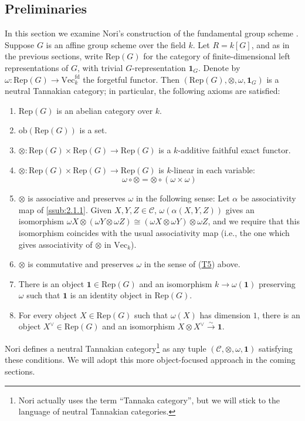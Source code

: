 \documentclass[10pt]{amsart}
\numberwithin{equation}{section}
\def\~#1{\mathscr{#1}}
\newcommand{\isom}{\xrightarrow{\sim}}
\newcommand{\fd}{\mathrm{fd}}
\newcommand{\ob}{\mathrm{ob}}
\renewcommand{\Vec}{\mathrm{Vec}}
\newcommand{\Rep}{\mathrm{Rep}}
\theoremstyle{plain}
\theoremstyle{definition}
\theoremstyle{remark}
\begin{document}
\subsection{Preliminaries}
In this section we examine Nori's construction of the fundamental group scheme \cite{nori76}. Suppose $G$ is an affine group scheme over the field $k$. Let $R = k[G]$, and as in the previous sections, write $\Rep(G)$ for the category of finite-dimensional left representations of $G$, with trivial $G$-representation $\mathbf{1}_G$. Denote by $\omega: \Rep(G) \to \Vec_k^\fd$ the forgetful functor. Then $(\Rep(G), \otimes, \omega, \mathbf{1}_G)$ is a neutral Tannakian category; in particular, the following axioms are satisfied:
\begin{enumerate}
    \item[(T1)] $\Rep(G)$ is an abelian category over $k$.
    \item[(T2)] $\ob\left(\Rep(G)\right)$ is a set.
    \item[(T3)] $\otimes: \Rep(G) \times \Rep(G) \to \Rep(G)$ is a $k$-additive faithful exact functor.
    \item[(T4)] $\otimes: \Rep(G) \times \Rep(G) \to \Rep(G)$ is $k$-linear in each variable:
    \[\omega \circ \otimes = \otimes \circ (\omega \times \omega) \]
    \item[(T5)]\label{T5} $\otimes$ is associative and preserves $\omega$ in the following sense: Let $\alpha$ be associativity map of \autoref{ssub:2.1.1}. Given $X, Y, Z \in \~C$, $\omega(\alpha(X, Y, Z))$ gives an isomorphism $\omega X \otimes (\omega Y \otimes \omega Z) \cong (\omega X \otimes \omega Y) \otimes \omega Z$, and we require that this isomorphism coincides with the usual associativity map (i.e., the one which gives associativity of $\otimes$ in $\Vec_k$).
    \item[(T6)]\label{T6} $\otimes$ is commutative and preserves $\omega$ in the sense of (\hyperref[T5]{T5}) above.
    \item[(T7)]\label{T7} There is an object $\mathbf{1} \in \Rep(G)$ and an isomorphism $k \to \omega(\mathbf{1})$ preserving $\omega$ such that $\mathbf{1}$ is an identity object in $\Rep(G)$.
    \item[(T8)] For every object $X \in \Rep(G)$ such that $\omega(X)$ has dimension $1$, there is an object $X^\vee \in \Rep(G)$ and an isomorphism $X \otimes X^\vee \isom \mathbf{1}$.
\end{enumerate}
Nori \cite{nori76} defines a neutral Tannakian category\footnote{Nori actually uses the term ``Tannaka category'', but we will stick to the language of neutral Tannakian categories.} as any tuple $(\~C, \otimes, \omega, \mathbf{1})$ satisfying these conditions. We will adopt this more object-focused approach in the coming sections. 
\end{document}
